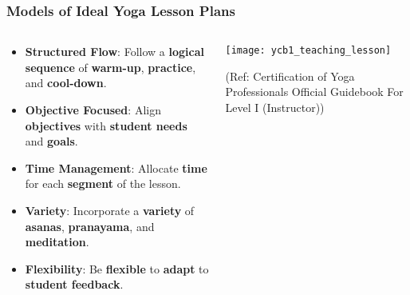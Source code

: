 \begin{frame}[fragile]\frametitle{Models of Ideal Yoga Lesson Plans}
\begin{columns}
    \begin{column}[T]{0.5\linewidth}
      \begin{itemize}
        \item \textbf{Structured Flow}: Follow a \textbf{logical sequence} of \textbf{warm-up}, \textbf{practice}, and \textbf{cool-down}.
        \item \textbf{Objective Focused}: Align \textbf{objectives} with \textbf{student needs} and \textbf{goals}.
        \item \textbf{Time Management}: Allocate \textbf{time} for each \textbf{segment} of the lesson.
        \item \textbf{Variety}: Incorporate a \textbf{variety} of \textbf{asanas}, \textbf{pranayama}, and \textbf{meditation}.
        \item \textbf{Flexibility}: Be \textbf{flexible} to \textbf{adapt} to \textbf{student feedback}.
      \end{itemize}
    \end{column}
    \begin{column}[T]{0.5\linewidth}
        \begin{center}
        \texttt{[image: ycb1\_teaching\_lesson]}
		
		{\tiny (Ref: Certification  of Yoga Professionals Official Guidebook For Level I (Instructor))}	
        \end{center}	
    \end{column}
\end{columns}
\end{frame}



